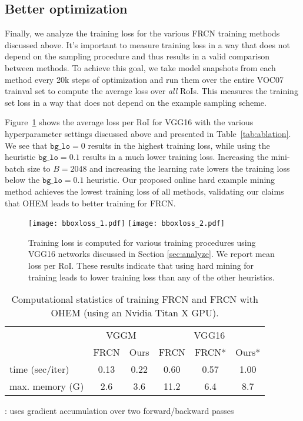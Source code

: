 \documentclass[10pt,twocolumn,letterpaper]{article}
\begin{document}
\subsection{Better optimization}
Finally, we analyze the training loss for the various FRCN training methods discussed above. It's important to measure training loss in a way that does not depend on the sampling procedure and thus results in a valid comparison between methods. To achieve this goal, we take model snapshots from each method every 20k steps of optimization and run them over the entire VOC07 trainval set to compute the average loss over \emph{all} RoIs. This measures the training set loss in a way that does not depend on the example sampling scheme.

Figure~\ref{fig:lossgraph} shows the average loss per RoI for VGG16 with the various hyperparameter settings discussed above and presented in Table~\ref{tab:ablation}. We see that $\texttt{bg\_lo}=0$ results in the highest training loss, while using the heuristic $\texttt{bg\_lo}=0.1$ results in a much lower training loss. Increasing the mini-batch size to $B=2048$ and increasing the learning rate lowers the training loss below the $\texttt{bg\_lo}=0.1$ heuristic. Our proposed online hard example mining method achieves the lowest training loss of all methods, validating our claims that OHEM leads to better training for FRCN.

\begin{figure}[t]
	\centering
	\texttt{[image: bboxloss\_1.pdf]}
	\texttt{[image: bboxloss\_2.pdf]}
	\caption[caption]{Training loss is computed for various training procedures using VGG16 networks discussed in Section \protect\ref{sec:analyze}. We report mean loss per RoI. These results indicate that using hard mining for training leads to lower training loss than any of the other heuristics.}
	\label{fig:lossgraph}
\end{figure}

\begin{table}[t]
	\centering
	\small
	\caption[caption]{Computational statistics of training FRCN \protect\cite{frcn} and FRCN with OHEM (using an Nvidia Titan X GPU).}
	\vspace{-0.05in}
	\begin{tabular}{@{}l c c c c c@{}}
		\toprule
		& \multicolumn{2}{c}{VGGM} & \multicolumn{3}{c}{VGG16}\\
		\cmidrule(l{1pt}r{2pt}){2-3}\cmidrule(l{2pt}){4-6}
		& FRCN & Ours & FRCN & FRCN* & Ours*\\
		\midrule
		time (sec/iter)& 0.13 & 0.22 & 0.60 & 0.57 & 1.00 \\
		max. memory (G) & 2.6 & 3.6 & 11.2 & 6.4 & 8.7 \\
		\bottomrule
	\end{tabular}
	{\small *: uses gradient accumulation over two forward/backward passes}
	\vspace{-0.1in}
	\label{tab:stats}
\end{table}
\end{document}
